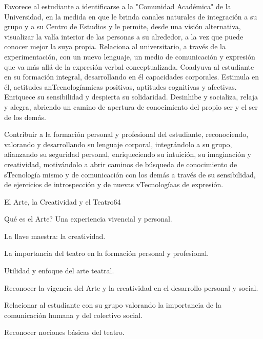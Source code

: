 \begin{syllabus}


\begin{justification}
Favorece al estudiante a identificarse a la "Comunidad Académica" de la Universidad, en la medida en que le brinda canales naturales de integración a su grupo y  a su Centro de Estudios y le permite,  desde una visión alternativa, visualizar la valía interior de las personas a su alrededor, a la vez que puede conocer mejor la suya propia. 
Relaciona al universitario, a través de la experimentación, con un nuevo lenguaje, un medio de comunicación y expresión que va más allá de la expresión verbal conceptualizada.
Coadyuva al estudiante en su formación integral, desarrollando en él  capacidades corporales. Estimula en él, actitudes anTecnologíamicas positivas,  aptitudes cognitivas y afectivas. Enriquece su sensibilidad y despierta su solidaridad.    
Desinhibe y socializa, relaja y alegra,  abriendo un camino de apertura de conocimiento del propio ser y el ser de los demás.

\end{justification}

\begin{goals}
\item Contribuir a la formación personal y profesional del estudiante, reconociendo, valorando y desarrollando su lenguaje corporal, integrándolo a su grupo, afianzando su seguridad personal, enriqueciendo su intuición, su imaginación y creatividad, motivándolo  a abrir caminos de búsqueda  de conocimiento de sTecnología mismo y de comunicación con los demás a través de su sensibilidad, de ejercicios de introspección y de nuevas vTecnologíaas de expresión.   
\end{goals}

\begin{outcomes}
\end{outcomes}

\begin{unit}{El Arte, la Creatividad y el Teatro}{}{6}{4}
\begin{topics}
	\item Qué es el Arte? Una experiencia vivencial y personal.
	\item La llave maestra: la creatividad.
	\item La importancia del teatro en la formación personal y profesional.
	\item Utilidad y enfoque del arte teatral.
\end{topics}
\begin{learningoutcomes}
	\item Reconocer la vigencia del Arte y la creatividad en el desarrollo personal y social.
	\item Relacionar al estudiante con su grupo valorando la importancia de la comunicación humana y del colectivo  social.
	\item Reconocer nociones  básicas del teatro. 
\end{learningoutcomes}
\end{unit}


\end{syllabus}
